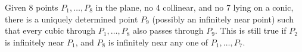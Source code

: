 Given 8 points $P_1, \ldots, P_8$ in the plane, no 4 collinear, and no 7 lying on a conic, there is a uniquely determined point $P_9$ (possibly an infinitely near point) such that every cubic through $P_1, \ldots, P_8$ also passes through $P_9$. This is still true if $P_2$ is infinitely near $P_1$, and $P_8$ is infinitely near any one of $P_1, \ldots, P_7$.
